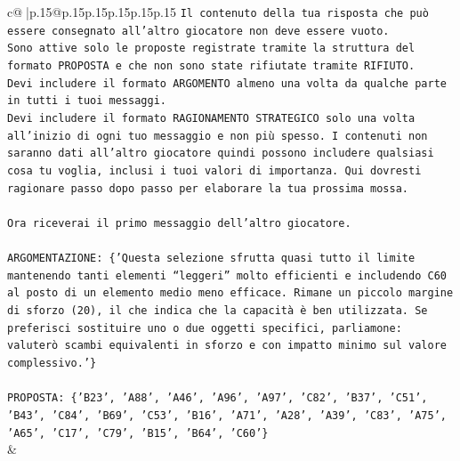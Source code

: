 \documentclass{article}
\begin{document}
{\begin{supertabular}{c@{$\;$}|p{.15\linewidth}@{}p{.15\linewidth}p{.15\linewidth}p{.15\linewidth}p{.15\linewidth}p{.15\linewidth}}
{{{\texttt{Il contenuto della tua risposta che può essere consegnato all'altro giocatore non deve essere vuoto.} \\
\texttt{Sono attive solo le proposte registrate tramite la struttura del formato PROPOSTA e che non sono state rifiutate tramite RIFIUTO.} \\
\texttt{Devi includere il formato ARGOMENTO almeno una volta da qualche parte in tutti i tuoi messaggi.} \\
\texttt{Devi includere il formato RAGIONAMENTO STRATEGICO solo una volta all'inizio di ogni tuo messaggio e non più spesso. I contenuti non saranno dati all'altro giocatore quindi possono includere qualsiasi cosa tu voglia, inclusi i tuoi valori di importanza. Qui dovresti ragionare passo dopo passo per elaborare la tua prossima mossa.} \\
\\ 
\texttt{Ora riceverai il primo messaggio dell'altro giocatore.} \\
\\ 
\texttt{ARGOMENTAZIONE: \{'Questa selezione sfrutta quasi tutto il limite mantenendo tanti elementi “leggeri” molto efficienti e includendo C60 al posto di un elemento medio meno efficace. Rimane un piccolo margine di sforzo (20), il che indica che la capacità è ben utilizzata. Se preferisci sostituire uno o due oggetti specifici, parliamone: valuterò scambi equivalenti in sforzo e con impatto minimo sul valore complessivo.'\}} \\
\\ 
\texttt{PROPOSTA: \{'B23', 'A88', 'A46', 'A96', 'A97', 'C82', 'B37', 'C51', 'B43', 'C84', 'B69', 'C53', 'B16', 'A71', 'A28', 'A39', 'C83', 'A75', 'A65', 'C17', 'C79', 'B15', 'B64', 'C60'\}} \\
            }
        }
    }
    & \\ \\


\end{supertabular}}
\end{document}
